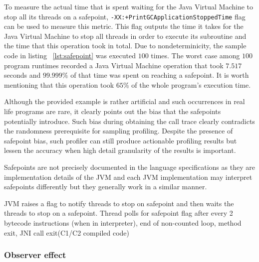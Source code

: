 \documentclass[..thesis.tex]{subfiles}
\begin{document}
To measure the actual time that is spent waiting for the Java Virtual Machine to stop all its threads on a safepoint, \texttt{-XX:+PrintGCApplicationStoppedTime} flag can be used to measure this metric. This flag outputs the time it takes for the Java Virtual Machine to stop all threads in order to execute its subroutine and the time that this operation took in total. Due to nondeterminicity, the sample code in listing ~\ref{lst:safepoint} was executed $100$ times. The worst case among $100$ program runtimes recorded a Java Virtual Machine operation that took $7.517$ seconds and $99.999\%$ of that time was spent on reaching a safepoint. It is worth mentioning that this operation took $65\%$ of the whole program's execution time.

Although the provided example is rather artificial and such occurrences in real life programs are rare, it clearly points out the bias that the safepoints potentially introduce. Such bias during obtaining the call trace clearly contradicts the randomness prerequisite for sampling profiling. Despite the presence of safepoint bias, such profiler can still produce actionable profiling results but lessen the accuracy when high detail granularity of the results is important.


Safepoints are not precisely documented in the language specifications as they are implementation details of the JVM and each JVM implementation may interpret safepoints differently but they generally work in a similar manner.

JVM raises a flag to notify threads to stop on safepoint and then waits the threads to stop on a safepoint. Thread polls for safepoint flag after every 2 bytecode instructions (when in interpreter), end of non-counted loop, method exit, JNI call exit(C1/C2 compiled code)

\subsubsection{Observer effect}
\end{document}
